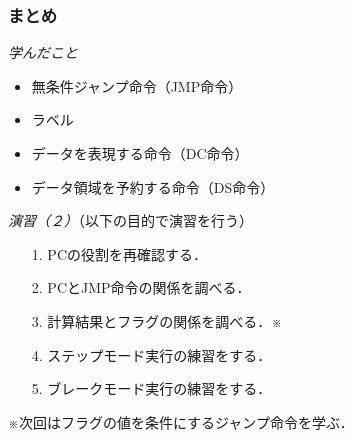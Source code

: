 \documentclass[handout]{beamer}        %
\begin{document}
\begin{frame}
  \frametitle{まとめ}
  \emph{学んだこと}
  \begin{itemize}
  \item 無条件ジャンプ命令（JMP命令）
  \item ラベル
  \item データを表現する命令（DC命令）
  \item データ領域を予約する命令（DS命令）
  \end{itemize}
  \vfill

  \emph{演習（２）}（以下の目的で演習を行う）
  \begin{enumerate}
  \item[1.] PCの役割を再確認する．
  \item[2.] PCとJMP命令の関係を調べる．
  \item[3.] 計算結果とフラグの関係を調べる．※
  \item[4.] ステップモード実行の練習をする．
  \item[5.] ブレークモード実行の練習をする．
  \end{enumerate}
  \vfill
  ※次回はフラグの値を条件にするジャンプ命令を学ぶ．
  \vfill
\end{frame}

\end{document}
